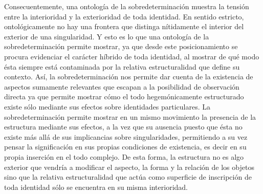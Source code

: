 Consecuentemente, una ontología de la sobredeterminación muestra la tensión entre la interioridad y la exterioridad de toda identidad. En sentido estricto, ontológicamente no hay una frontera que distinga nítidamente el interior del exterior de una singularidad. Y esto es lo que una ontología de la sobredeterminación permite mostrar, ya que desde este posicionamiento se procura evidenciar el carácter híbrido de toda identidad, al mostrar de qué modo ésta siempre está contaminada por la relativa estructuralidad que define su contexto. Así, la sobredeterminación nos permite dar cuenta de la existencia de aspectos sumamente relevantes que escapan a la posibilidad de observación directa ya que permite mostrar cómo el todo hegemónicamente estructurado existe sólo mediante sus efectos sobre identidades particulares. La sobredeterminación permite mostrar en un mismo movimiento la presencia de la estructura mediante sus efectos, a la vez que su ausencia puesto que ésta no existe más allá de sus implicancias sobre singularidades, permitiendo a su vez pensar la significación en sus propias condiciones de existencia, es decir en su propia inserción en el todo complejo. De esta forma, la estructura no es algo exterior que vendría a modificar el aspecto, la forma y la relación de los objetos sino que la relativa estructuralidad que actúa como superficie de inscripción de toda identidad sólo se encuentra en su misma interioridad.

